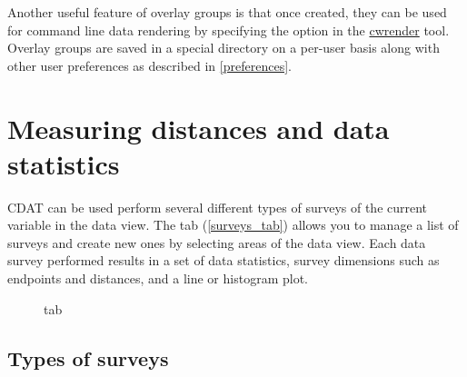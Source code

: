 Another useful feature of overlay groups is that once created,
they can be used for command line data rendering by specifying
the  option in the
\hyperlink{cwrender}{cwrender} tool.  Overlay groups are saved in
a special directory on a per-user basis along with other user
preferences as described in \autoref{preferences}.

\section{Measuring distances and data statistics}
\label{surveys}

CDAT can be used perform several different types of surveys of
the current variable in the data view.  The
 tab (\autoref{surveys_tab})
allows you to manage a list of surveys and create new ones by
selecting areas of the data view.  Each data survey performed
results in a set of data statistics, survey dimensions such as
endpoints and distances, and a line or histogram plot.

\begin{figure}
  \begin{center}
    \caption[Data Surveys tab]{
        tab
    }
    \label{surveys_tab}
  \end{center}
\end{figure}

\subsection{Types of surveys}

